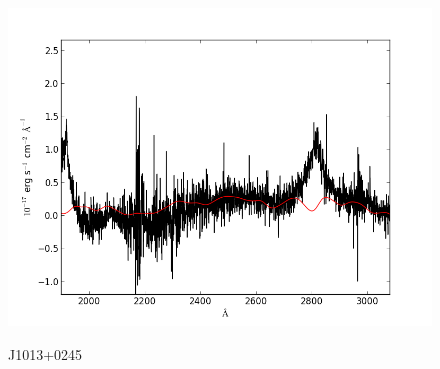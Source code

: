 \documentclass[usenatbib]{mn2e}
\begin{document}
\begin{figure}
\begin{center}
\vspace{5mm}
\includegraphics[width=0.49\linewidth,angle=0]{./red/fe_fit_SBB_11.png}\\

\end{center} 
\caption{J1013+0245 \label{fig:landscape}}   
\end{figure}

\newpage
\end{document}
